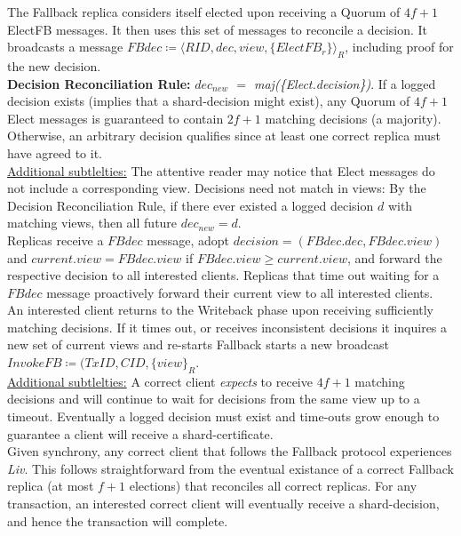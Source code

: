 The Fallback replica considers itself elected upon receiving a Quorum of $4f+1$ ElectFB messages. It then uses this set of messages to reconcile a decision. It broadcasts a message $FBdec \coloneqq \langle RID, dec, view, \{ElectFB_r\} \rangle_R$, including proof for the new decision. \\
\textbf{Decision Reconciliation Rule:} \textit{$dec_{new}$ $=$ maj(\{Elect.decision\})}. If a logged decision exists (implies that a shard-decision might exist), any Quorum of $4f+1$ Elect messages is guaranteed to contain $2f+1$ matching decisions (a majority). Otherwise, an arbitrary decision qualifies since at least one correct replica must have agreed to it.\\
\underline{Additional subtlelties:} The attentive reader may notice that Elect messages do not include a corresponding view. Decisions need not match in views: By the Decision Reconciliation Rule, if there ever existed a logged decision $d$ with matching views, then all future $dec_{new} = d$.\\
Replicas receive a $FBdec$ message, adopt $decision = (FBdec.dec, FBdec.view)$ and $current.view = FBdec.view$ if $FBdec.view \geq current.view$, and forward the respective decision to all interested clients. Replicas that time out waiting for a $FBdec$ message proactively forward their current view to all interested clients. \\
An interested client returns to the Writeback phase upon receiving sufficiently matching decisions. If it times out, or receives inconsistent decisions it inquires a new set of current views and re-starts Fallback starts a new broadcast $InvokeFB \coloneqq (TxID, CID, \{view\}_R$.\\
\underline{Additional subtlelties:} A correct client \textit{expects} to receive $4f+1$ matching decisions and will continue to wait for decisions from the same view up to a timeout. Eventually a logged decision must exist and time-outs grow enough to guarantee a client will receive a shard-certificate. \\
Given synchrony, any correct client that follows the Fallback protocol experiences \textit{Liv}. This follows straightforward from the eventual existance of a correct Fallback replica (at most $f+1$ elections) that reconciles all correct replicas. For any transaction, an interested correct client will eventually receive a shard-decision, and hence the transaction will complete.

